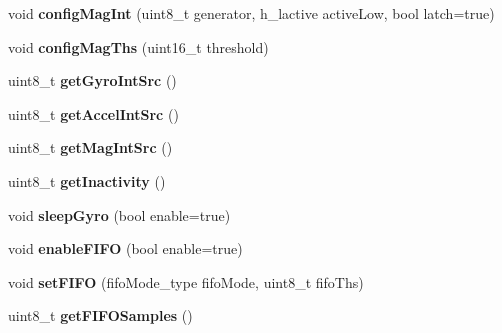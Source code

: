 \begin{DoxyCompactItemize}
\item 
\mbox{\label{classLSM9DS1_a54a521668eb63d504d227c6d460723e0}} 
void {\bfseries config\+Mag\+Int} (uint8\+\_\+t generator, h\+\_\+lactive active\+Low, bool latch=true)
\item 
\mbox{\label{classLSM9DS1_a87cf3dd3a4d9ca79106eb7c1c866a224}} 
void {\bfseries config\+Mag\+Ths} (uint16\+\_\+t threshold)
\item 
\mbox{\label{classLSM9DS1_aaba6696754df62a411a6a190100f9ca3}} 
uint8\+\_\+t {\bfseries get\+Gyro\+Int\+Src} ()
\item 
\mbox{\label{classLSM9DS1_ae42ae3b368370f977d090ba0e53c7f5c}} 
uint8\+\_\+t {\bfseries get\+Accel\+Int\+Src} ()
\item 
\mbox{\label{classLSM9DS1_a2bc92a37db982059b89e0a06e7d05a95}} 
uint8\+\_\+t {\bfseries get\+Mag\+Int\+Src} ()
\item 
\mbox{\label{classLSM9DS1_a9dab029d1d24e49709258d893042d28f}} 
uint8\+\_\+t {\bfseries get\+Inactivity} ()
\item 
\mbox{\label{classLSM9DS1_a13b61812069b399547f177b0b0af8fe3}} 
void {\bfseries sleep\+Gyro} (bool enable=true)
\item 
\mbox{\label{classLSM9DS1_a5f01141131318697838f15d7e5d10f2c}} 
void {\bfseries enable\+F\+I\+FO} (bool enable=true)
\item 
\mbox{\label{classLSM9DS1_a0ec4a93a34545af1acc336bae9b360f1}} 
void {\bfseries set\+F\+I\+FO} (fifo\+Mode\+\_\+type fifo\+Mode, uint8\+\_\+t fifo\+Ths)
\item 
\mbox{\label{classLSM9DS1_ac03ef2ff928a25c4a80af7707cd92dc8}} 
uint8\+\_\+t {\bfseries get\+F\+I\+F\+O\+Samples} ()
\end{DoxyCompactItemize}
